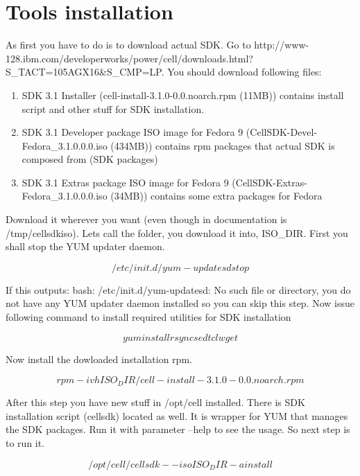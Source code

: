 \section{Tools installation}
As first you have to do is to download actual SDK. Go to http://www-128.ibm.com/developerworks/power/cell/downloads.html?S_TACT=105AGX16&S_CMP=LP. You should download following files:

\begin{enumerate} 
\item SDK 3.1 Installer (cell-install-3.1.0-0.0.noarch.rpm  (11MB))
contains install script and other stuff for SDK installation.
\item SDK 3.1 Developer package ISO image for Fedora 9 (CellSDK-Devel-Fedora_3.1.0.0.0.iso  (434MB))
contains rpm packages that actual SDK is composed from (SDK packages) 
\item SDK 3.1 Extras package ISO image for Fedora 9 (CellSDK-Extras-Fedora_3.1.0.0.0.iso  (34MB))
contains some extra packages for Fedora
\end{enumerate}

Download it wherever you want (even though in documentation is /tmp/cellsdkiso). Lets call the folder, you download it into, ISO_DIR.  First you shall stop the YUM updater daemon.

\begin{equation}
/etc/init.d/yum-updatesd stop
\end{equation}

If this outputs: bash: /etc/init.d/yum-updatesd: No such file or directory, you do not have any YUM updater daemon installed so you can skip this step. Now issue following command to install required utilities for SDK installation

\begin{equation}
yum install rsync sed tcl wget
\end{equation}

Now install the dowloaded installation rpm.

\begin{equation}
rpm -ivh ISO_DIR/cell-install-3.1.0-0.0.noarch.rpm
\end{equation}

After this step you have new stuff in /opt/cell installed. There is SDK installation script (cellsdk) located as well. It is wrapper for YUM that manages the SDK packages. Run it with parameter --help to see the usage. So next step is to run it. 

\begin{equation}
/opt/cell/cellsdk --iso ISO_DIR -a install
\end{equation}

